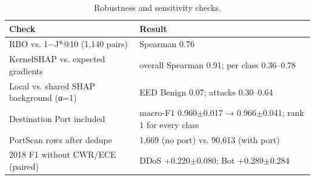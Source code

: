 \begin{table}[t]
\centering
\caption{Robustness and sensitivity checks.}
\label{tab:robustness}
\scriptsize
\setlength{\tabcolsep}{3pt}
\begin{tabular}{ll}
\toprule
Check & Result \\
\midrule
RBO vs. 1−J*@10 (1,140 pairs) & Spearman 0.76 \\
KernelSHAP vs. expected gradients & overall Spearman 0.91; per class 0.36–0.78 \\
Local vs. shared SHAP background (α=1) & EED Benign 0.07; attacks 0.30–0.64 \\
Destination Port included & macro-F1 0.960$\pm$0.017 → 0.966$\pm$0.041; rank 1 for every class \\
PortScan rows after dedupe & 1,669 (no port) vs. 90,613 (with port) \\
2018 F1 without CWR/ECE (paired) & DDoS +0.220$\pm$0.080; Bot +0.289$\pm$0.284 \\
\bottomrule
\end{tabular}
\end{table}